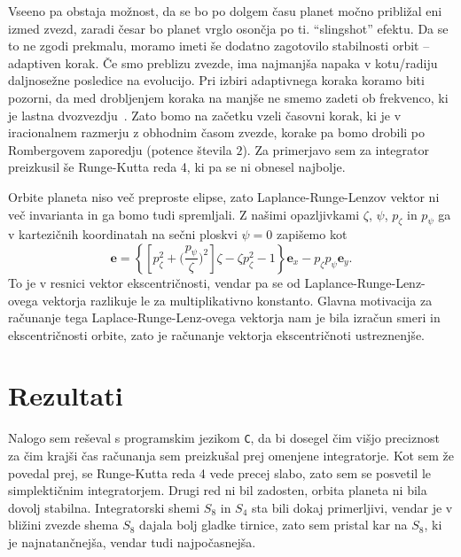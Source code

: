 \documentclass[12pt, a4paper]{article}
\newcommand{\ee}{
    \ensuremath{\mathbf{e}}
}
\begin{document}
Vseeno pa obstaja mo\v znost, da se bo po dolgem \v casu planet mo\v cno pribli\v zal eni izmed
zvezd, zaradi \v cesar bo planet vrglo oson\v cja po ti. "`slingshot"' efektu. Da se to ne zgodi prekmalu, moramo
imeti \v se dodatno zagotovilo stabilnosti orbit -- adaptiven korak. \v Ce smo preblizu zvezde, ima najmanj\v sa
napaka v kotu/radiju daljnose\v zne posledice na evolucijo. Pri izbiri adaptivnega koraka koramo biti pozorni,
da med drobljenjem koraka na manj\v se ne smemo zadeti ob frekvenco, ki je lastna dvozvezdju~\cite{richardson}.
Zato bomo na za\v cetku vzeli \v casovni korak, ki je v iracionalnem razmerju z obhodnim \v casom zvezde, korake
pa bomo drobili po Rombergovem zaporedju (potence \v stevila $2$). Za primerjavo sem za integrator preizkusil
\v se Runge-Kutta reda 4, ki pa se ni obnesel najbolje.

Orbite planeta niso ve\v c preproste elipse, zato Laplance-Runge-Lenzov vektor ni ve\v c invarianta in ga bomo
tudi spremljali. Z na\v simi opazljivkami $\zeta$, $\psi$, $p_\zeta$ in $p_\psi$ ga v kartezi\v cnih koordinatah
na se\v cni ploskvi $\psi = 0$ zapi\v semo kot
\begin{equation}
	\ee = \left\{\left[p_\zeta^2 + \Big(\frac{p_\psi}{\zeta}\Big)^2\right]\zeta - \zeta p_\zeta^2 - 1\right\}
		\ee_x - p_\zeta p_\psi \ee_y.
\end{equation}
To je v resnici vektor ekscentri\v cnosti, vendar pa se od Laplance-Runge-Lenz-ovega vektorja razlikuje le
za multiplikativno konstanto. Glavna motivacija za ra\v cunanje tega Laplace-Runge-Lenz-ovega vektorja nam
je bila izra\v cun smeri in ekscentri\v cnosti orbite, zato je ra\v cunanje vektorja ekscentri\v cnoti
ustreznenj\v se.

\section{Rezultati}

Nalogo sem re\v seval s programskim jezikom {\tt C}, da bi dosegel \v cim vi\v sjo preciznost za \v cim
kraj\v si \v cas ra\v cunanja sem preizku\v sal prej omenjene integratorje. Kot sem \v ze povedal prej,
se Runge-Kutta reda 4 vede precej slabo, zato sem se posvetil le simplekti\v cnim integratorjem. Drugi
red ni bil zadosten, orbita planeta ni bila dovolj stabilna. Integratorski shemi $S_8$ in $S_4$ sta bili
dokaj primerljivi, vendar je v bli\v zini zvezde shema $S_8$ dajala bolj gladke tirnice, zato sem pristal
kar na $S_8$, ki je najnatan\v cnej\v sa, vendar tudi najpo\v casnej\v sa.
\end{document}

